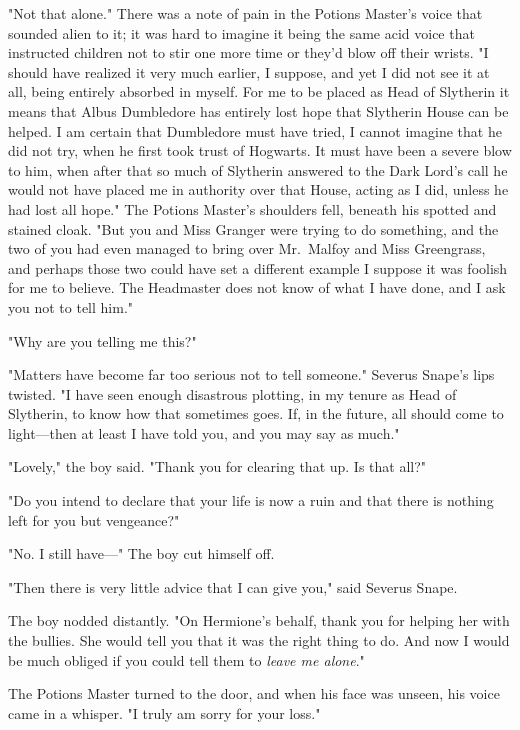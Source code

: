 "Not that alone." There was a note of pain in the Potions Master's voice that
sounded alien to it; it was hard to imagine it being the same acid voice that
instructed children not to stir one more time or they'd blow off their wrists.
"I should have realized it{\el} very much earlier, I suppose, and yet I did
not see it at all, being entirely absorbed in myself. For me to be placed as
Head of Slytherin{\el} it means that Albus Dumbledore has entirely lost hope
that Slytherin House can be helped. I am certain that Dumbledore must have
tried, I cannot imagine that he did not try, when he first took trust of
Hogwarts. It must have been a severe blow to him, when after that so much of
Slytherin answered to the Dark Lord's call{\el} he would not have placed me
in authority over that House, acting as I did, unless he had lost all hope."
The Potions Master's shoulders fell, beneath his spotted and stained cloak.
"But you and Miss Granger were trying to do something, and the two of you had
even managed to bring over Mr.~Malfoy and Miss Greengrass, and perhaps those
two could have set a different example{\el} I suppose it was foolish for me
to believe. The Headmaster does not know of what I have done, and I ask you not
to tell him."

"Why are you telling me this?"

"Matters have become far too serious not to tell someone." Severus Snape's lips
twisted. "I have seen enough disastrous plotting, in my tenure as Head of
Slytherin, to know how that sometimes goes. If, in the future, all should come
to light—then at least I have told you, and you may say as much."

"Lovely," the boy said. "Thank you for clearing that up. Is that all?"

"Do you intend to declare that your life is now a ruin and that there is
nothing left for you but vengeance?"

"No. I still have—" The boy cut himself off.

"Then there is very little advice that I can give you," said Severus Snape.

The boy nodded distantly. "On Hermione's behalf, thank you for helping her with
the bullies. She would tell you that it was the right thing to do. And now I
would be much obliged if you could tell them to \emph{leave me alone}."

The Potions Master turned to the door, and when his face was unseen, his voice
came in a whisper. "I truly am sorry for your loss."

